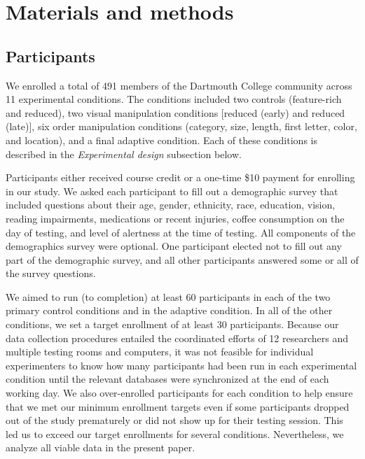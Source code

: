 \documentclass[11pt]{article}
\begin{document}
\section*{Materials and methods}

\subsection*{Participants}

We enrolled a total of 491 members of the Dartmouth College community across 11
experimental conditions. The conditions included two controls (feature-rich and
reduced), two visual manipulation conditions [reduced (early) and reduced
(late)], six order manipulation conditions (category, size, length, first
letter, color, and location), and a final adaptive condition. Each of these
conditions is described in the \textit{Experimental design} subsection below.

Participants either received course credit or a one-time \$10 payment for
enrolling in our study. We asked each participant to fill out a demographic
survey that included questions about their age, gender, ethnicity, race,
education, vision, reading impairments, medications or recent injuries, coffee
consumption on the day of testing, and level of alertness at the time of
testing. All components of the demographics survey were optional. One
participant elected not to fill out any part of the demographic survey, and all
other participants answered some or all of the survey questions.

We aimed to run (to completion) at least 60 participants in each of the two
primary control conditions and in the adaptive condition. In all of the other
conditions, we set a target enrollment of at least 30 participants. Because our
data collection procedures entailed the coordinated efforts of 12 researchers
and multiple testing rooms and computers, it was not feasible for individual
experimenters to know how many participants had been run in each experimental
condition until the relevant databases were synchronized at the end of each
working day. We also over-enrolled participants for each condition to help
ensure that we met our minimum enrollment targets even if some participants
dropped out of the study prematurely or did not show up for their testing
session. This led us to exceed our target enrollments for several conditions.
Nevertheless, we analyze all viable data in the present paper.
\end{document}
